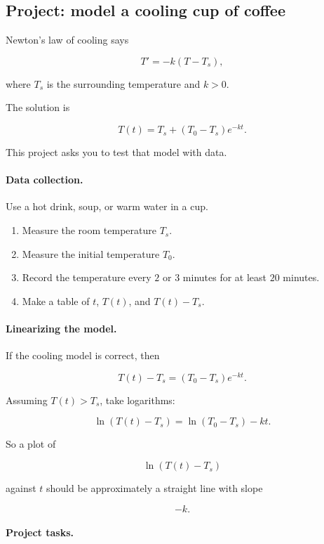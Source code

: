 \subsection{Project: model a cooling cup of coffee}
\label{subsec:project-cooling-cup-coffee}

Newton's law of cooling says

\[
T'=-k(T-T_s),
\]

where \(T_s\) is the surrounding temperature and \(k>0\).

The solution is

\[
\boxed{
T(t)=T_s+(T_0-T_s)e^{-kt}.
}
\]

This project asks you to test that model with data.

\paragraph{Data collection.}
Use a hot drink, soup, or warm water in a cup.

\begin{enumerate}
\item Measure the room temperature \(T_s\).

\item Measure the initial temperature \(T_0\).

\item Record the temperature every \(2\) or \(3\) minutes for at least \(20\) minutes.

\item Make a table of \(t\), \(T(t)\), and \(T(t)-T_s\).
\end{enumerate}

\paragraph{Linearizing the model.}
If the cooling model is correct, then

\[
T(t)-T_s=(T_0-T_s)e^{-kt}.
\]

Assuming \(T(t)>T_s\), take logarithms:

\[
\ln(T(t)-T_s)=\ln(T_0-T_s)-kt.
\]

So a plot of

\[
\ln(T(t)-T_s)
\]

against \(t\) should be approximately a straight line with slope

\[
-k.
\]

\paragraph{Project tasks.}

